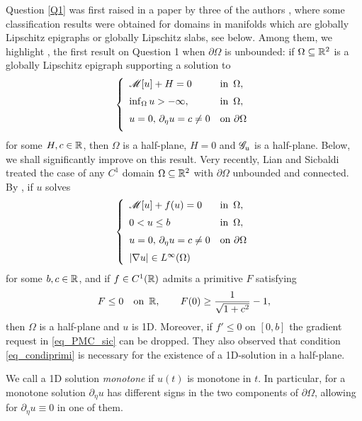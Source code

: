 \documentclass[10 pt,a4paper]{article}
\theoremstyle{definition}
\begin{document}
Question \ref{Q1} was first raised in a paper by three of the authors \cite{cmr}, where some classification results were obtained for domains in manifolds which are globally Lipschitz epigraphs or globally Lipschitz slabs, see below. Among them, we highlight \cite[Theorem 1.3]{cmr}, the first result on Question 1 when $\partial \Omega$ is unbounded: if $\Omega \subseteq \mathbb R^2$ is a globally Lipschitz epigraph supporting a solution to 
\[
	\left\{ \begin{array}{ll}
		\mathscr{M}[u] + H = 0 & \text{in } \, \Omega, \\[0.2cm]
		\inf_\Omega u > -\infty, & \text{in } \, \Omega, \\[0.2cm]
		u=0, \, \partial_\eta u = c \neq 0 & \text{on $\partial \Omega$} \\[0.2cm]
	\end{array}\right.
\]
for some $H,c \in \mathbb R$, then $\Omega$ is a half-plane, $H=0$ and $\mathscr{G}_u$ is a half-plane. Below, we shall significantly improve on this result. Very recently, Lian and Sicbaldi treated the case of any $C^1$ domain $\Omega \subseteq \mathbb R^2$ with $\partial \Omega$ unbounded and connected. By \cite[Theorem 1]{lian_sicbaldi}, if $u$ solves   
\begin{equation}\label{eq_PMC_sic}
	\left\{ \begin{array}{ll}
		\mathscr{M}[u] + f(u) = 0 & \text{in } \, \Omega, \\[0.2cm]
		0 < u \le b & \text{in } \, \Omega, \\[0.2cm]
		u= 0, \, \partial_\eta u = c \neq 0 & \text{on $\partial \Omega$} \\[0.2cm]
		|\nabla u| \in L^\infty(\Omega) 		
	\end{array}\right.
\end{equation}
for some $b,c \in \mathbb R$, and if $f \in C^1(\mathbb R)$ admits a primitive $F$ satisfying 
\begin{equation}\label{eq_condiprimi}
	F \le 0 \quad \text{on } \, \mathbb R, \qquad F(0) \ge \frac{1}{\sqrt{1+c^2}} - 1, 
\end{equation}
then $\Omega$ is a half-plane and $u$ is 1D. Moreover, if $f' \le 0$ on $[0,b]$ the gradient request in \eqref{eq_PMC_sic} can be dropped. They also observed that condition \eqref{eq_condiprimi} is necessary for the existence of a 1D-solution in a half-plane.

We call a 1D solution \emph{monotone} if $u(t)$ is monotone in $t$. In particular, for a monotone solution $\partial_\eta u$ has different signs in the two components of $\partial \Omega$, allowing for $\partial_\eta u \equiv 0$ in one of them.
 
\end{document}
